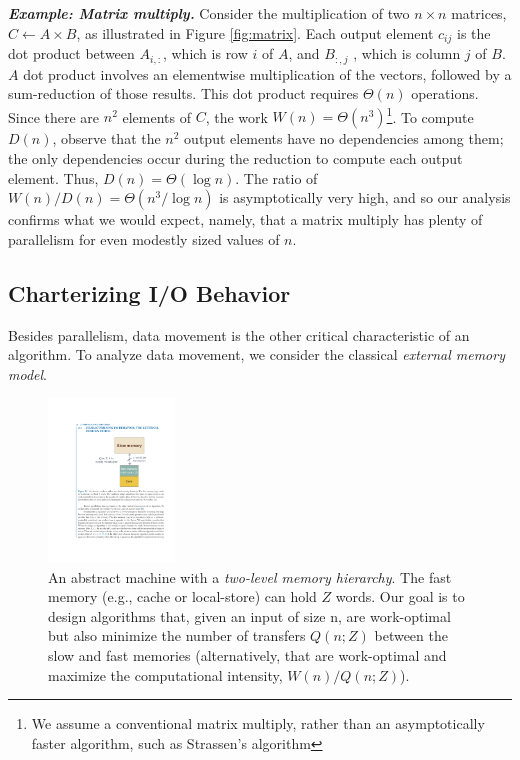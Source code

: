 \documentclass[twocolumn]{article}
\begin{document}
\noindent
\textbf{\textit{Example: Matrix multiply.}} 
Consider the multiplication of two $n × n$ matrices, $C \leftarrow A × B$, as illustrated in Figure \ref{fig:matrix}. 
Each output element $c_{ij}$ is the dot product between $A_{i,:}$, which is row $i$ of $A$, and $B_{:,j}$ , which is column $j$ of $B$. $A$ dot product involves an elementwise multiplication of the vectors, followed by a sum-reduction of those results. This dot product requires $\Theta (n)$ operations.
Since there are $n^2$ elements of $C$, the work $W(n) = \Theta(n^3)$\footnote{We assume a conventional matrix multiply, rather than an asymptotically faster algorithm, such as Strassen’s algorithm}.
To compute $D(n)$, observe that the $n^2$ output elements have no dependencies among them; the only dependencies occur during the reduction to compute each output element. Thus, $D(n) = \Theta(\log n)$. 
The ratio of $W(n)/D(n) = \Theta(n^3/\log n)$ is asymptotically very high, and so our analysis confirms what we would expect, namely, that a matrix multiply has plenty of parallelism for even modestly sized values of $n$.
\subsection{Charterizing I/O Behavior}
Besides parallelism, data movement is the other critical characteristic of an algorithm. To analyze data movement, we consider the classical \textit{external memory model}. 
\begin{figure}[htb]
        \centering
        \includegraphics[width=0.3\textwidth]{abstract-machine.pdf}
        \caption{An abstract machine with a \textit{two-level memory hierarchy}. The fast memory (e.g., cache or local-store) can hold $Z$ words. Our goal is to design algorithms that, given an input of size n, are work-optimal but also minimize the number of transfers $Q(n; Z)$ between the slow and fast memories (alternatively, that are work-optimal and maximize the computational intensity, $W (n)/Q(n; Z)$).}
        \label{fig:abstract-machine}
\end{figure}
\end{document}
